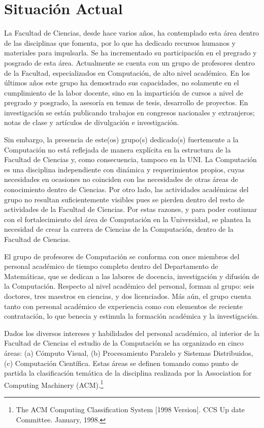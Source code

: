 \section{Situaci\'on Actual}\label{sec:cs-sit-actual}

La Facultad de Ciencias, desde hace varios a\~nos, ha contemplado esta \'area dentro de las disciplinas que fomenta, por lo que ha dedicado recursos humanos y materiales para impulsarla. Se ha incrementado su participaci\'on en el pregrado y posgrado de esta \'area. Actualmente se cuenta con un grupo de profesores dentro de la Facultad, especializados en Computaci\'on, de alto nivel acad\'emico. En los \'ultimos a\~nos este grupo ha demostrado sus capacidades, no solamente en el cumplimiento de la labor docente, sino en la impartici\'on de cursos a nivel de pregrado y posgrado, la asesor\'ia en temas de tesis, desarrollo de proyectos. En investigaci\'on se est\'an publicando trabajos en congresos nacionales y extranjeros; notas de clase y art\'iculos de divulgaci\'on e investigaci\'on.

Sin embargo, la presencia de este(os) grupo(s) dedicado(s) fuertemente a la Computaci\'on no est\'a reflejada de manera expl\'icita en la estructura de la Facultad de Ciencias y, como consecuencia, tampoco en la UNI. La Computaci\'on es una disciplina independiente con din\'amica y requerimientos propios, cuyas necesidades en ocasiones no coinciden con las necesidades de otras \'areas de conocimiento dentro de Ciencias. Por otro lado, las actividades acad\'emicas del grupo no resultan suficientemente visibles pues se pierden dentro del resto de actividades de la Facultad de Ciencias. Por estas razones, y para poder continuar con el fortalecimiento del \'area de Computaci\'on en la Universidad, se plantea la necesidad de crear la carrera de Ciencias de la Computaci\'on, dentro de la Facultad de Ciencias.

El grupo de profesores de Computaci\'on se conforma con once miembros del personal acad\'emico de tiempo completo dentro del Departamento de Matem\'aticas, que se dedican a las labores de docencia, investigaci\'on y difusi\'on de la Computaci\'on. Respecto al nivel acad\'emico del personal, forman al grupo: seis doctores, tres maestros en ciencias, y dos licenciados. M\'as a\'un, el grupo cuenta tanto con personal acad\'emico de experiencia como con elementos de reciente contrataci\'on, lo que benecia y estimula la formaci\'on acad\'emica y la investigaci\'on.

Dados los diversos intereses y habilidades del personal acad\'emico, al interior de la Facultad de Ciencias el estudio de la Computaci\'on se ha organizado en cinco \'areas: (a) C\'omputo Visual, (b) Procesamiento Paralelo y Sistemas Distribuidos, (c) Computaci\'on Cient\'ifica. Estas \'areas se definen tomando como punto de partida la clasificaci\'on tem\'atica de la disciplina realizada por la Association for Computing Machinery (ACM).\footnote{The ACM Computing Classification System [1998 Version]. CCS Up date Committee. January, 1998.}


